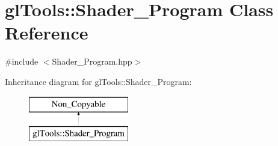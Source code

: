 \section{gl\+Tools\+::Shader\+\_\+\+Program Class Reference}
\label{classgl_tools_1_1_shader___program}


{\ttfamily \#include $<$Shader\+\_\+\+Program.\+hpp$>$}

Inheritance diagram for gl\+Tools\+::Shader\+\_\+\+Program\+:\begin{figure}[H]
\begin{center}
\leavevmode
\includegraphics[height=2.000000cm]{classgl_tools_1_1_shader___program}
\end{center}
\end{figure}
